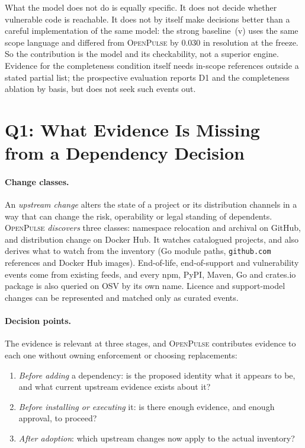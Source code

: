 \documentclass[11pt,a4paper]{article}
\newcommand{\op}{\textsc{OpenPulse}}
\newcommand{\code}[1]{\texttt{#1}}
\begin{document}
What the model does not do is equally specific. It does not decide
whether vulnerable code is reachable. It does not by itself make
decisions better than a careful implementation of the same model: the
strong baseline~(v) uses the same scope language and differed from
\op{} by 0.030 in resolution at the freeze. So the contribution is the
model and its checkability, not a superior engine. Evidence for the
completeness condition itself needs in-scope references
outside a stated partial list; the prospective evaluation reports D1
and the completeness ablation by basis, but does not seek such events
out.

\section{Q1: What Evidence Is Missing from a Dependency Decision}
\label{sec:problem}

\paragraph{Change classes.} An \emph{upstream change} alters the state
of a project or its distribution channels in a way that can change the
risk, operability or legal standing of dependents. \op{}
\emph{discovers} three classes: namespace relocation and archival on
GitHub, and distribution change on Docker Hub. It watches catalogued
projects, and also derives what to watch from the inventory (Go module paths, \code{github.com}
references and Docker Hub images). End-of-life, end-of-support and
vulnerability events come from existing feeds, and every npm, PyPI,
Maven, Go and crates.io package is also queried on OSV by its own
name.
Licence and support-model changes can be represented and matched only
as curated events.

\paragraph{Decision points.} The evidence is relevant at three stages,
and \op{} contributes evidence to each one without owning enforcement
or choosing replacements:
\begin{enumerate}[leftmargin=*,nosep]
  \item \emph{Before adding} a dependency: is the proposed identity
    what it appears to be, and what current upstream evidence exists
    about it?
  \item \emph{Before installing or executing} it: is there enough
    evidence, and enough approval, to proceed?
  \item \emph{After adoption}: which upstream changes now apply to
    the actual inventory?
\end{enumerate}
\end{document}
